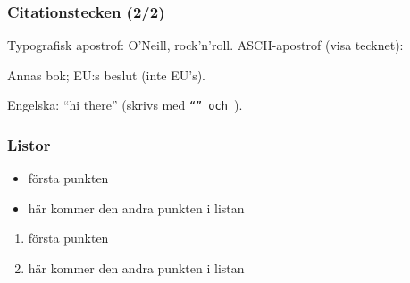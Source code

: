 \begin{frame}[fragile,t]
  \frametitle{Citationstecken (2/2)}


\begin{exlatex}
Typografisk apostrof: O\textquoteright{}Neill, rock\textquoteright n\textquoteright{}roll.
ASCII-apostrof (visa tecknet): \textquotesingle

Annas bok; EU:s beslut (inte EU\textquoteright s).

Engelska: \enquote{hi there} (skrivs med \texttt{\enquote{} och \texttt{}}).
\end{exlatex}

\end{frame}


\begin{frame}[fragile,t]
  \frametitle{Listor}
  \vspace{1em}
  

  \begin{exlatex}
\begin{itemize}
  \item första punkten
  \item här kommer den andra
  punkten i listan
\end{itemize}
  \end{exlatex}

  \blankline

  \begin{exlatex}
\begin{enumerate}
  \item första punkten
  \item här kommer den andra
  punkten i listan
\end{enumerate}
  \end{exlatex}

\end{frame}


